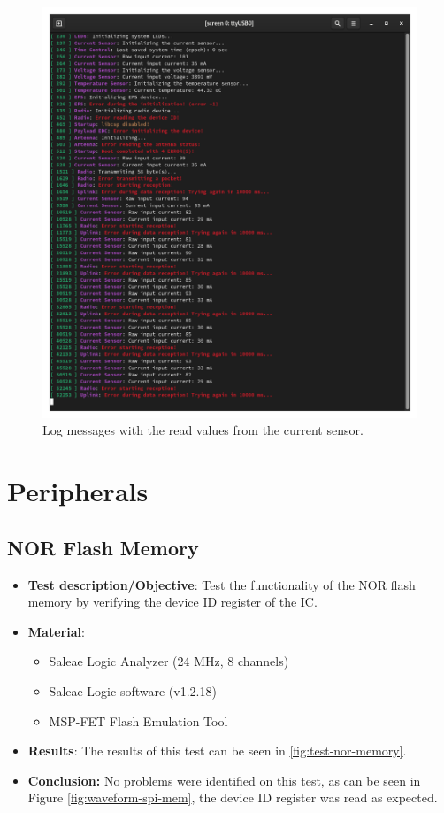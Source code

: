 \begin{figure}[!ht]
    \begin{center}
        \includegraphics[width=0.7\columnwidth]{figures/v05/log-current-sensor.png}
        \caption{Log messages with the read values from the current sensor.}
        \label{fig:log-current-sensor}
    \end{center}
\end{figure}

\section{Peripherals}

\subsection{NOR Flash Memory}

\begin{itemize}
    \item \textbf{Test description/Objective}: Test the functionality of the NOR flash memory by verifying the device ID register of the IC.
    \item \textbf{Material}:
        \begin{itemize}
            \item Saleae Logic Analyzer (24 MHz, 8 channels)
            \item Saleae Logic software (v1.2.18)
            \item MSP-FET Flash Emulation Tool
        \end{itemize}
    \item \textbf{Results}: The results of this test can be seen in \autoref{fig:test-nor-memory}.
    \item \textbf{Conclusion:} No problems were identified on this test, as can be seen in Figure \ref{fig:waveform-spi-mem}, the device ID register was read as expected.
\end{itemize}

